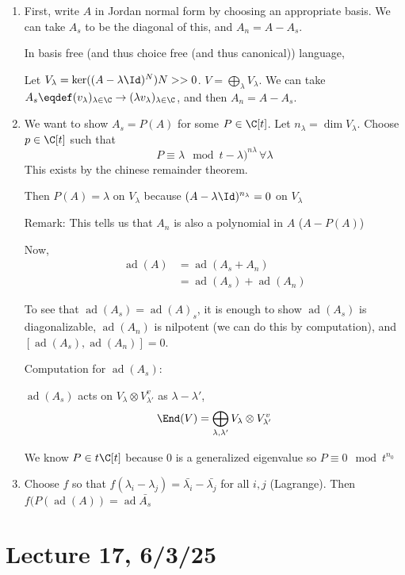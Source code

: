 \documentclass[x11names,reqno,14pt]{extarticle}
\DeclareMathOperator{\ad}{ad}
\begin{document}
\proof[sketch]
\begin{enumerate}

\item First, write $A$ in Jordan normal form by choosing an appropriate basis. We can take $A_s$ to be the diagonal of this, and $A_n = A - A_s$. 

In basis free (and thus choice free (and thus canonical)) language, 

Let $V_\lambda = \ker((A-\lambda\Id)^N) N >>0$. $V = \bigoplus_\lambda V_\lambda$. We can take $A_s \eqdef (v_\lambda)_{\lambda\in\C} \to (\lambda v_\lambda)_{\lambda\in\C}$, and then $A_n = A - A_s$.

\item We want to show $A_s = P(A)$ for some $P \in \C[t]$. Let $n_\lambda = \dim V_\lambda$. Choose $p \in \C[t]$ such that 
\[
P \equiv \lambda \mod {t-\lambda)^{n\lambda}}\,\forall\lambda
\]
This exists by the chinese remainder theorem. 

Then $P(A) = \lambda$ on $V_\lambda$ because $(A - \lambda\Id)^{n_\lambda} = 0$ on $V_\lambda$

Remark: This tells us that $A_n$ is also a polynomial in $A$ ($A - P(A)$)

Now,
\begin{align*}
\ad(A) & = \ad(A_s + A_n) \\
& = \ad(A_s) + \ad(A_n)
\end{align*}

To see that $\ad(A_s) = \ad(A)_s$, it is enough to show $\ad(A_s)$ is diagonalizable, $\ad(A_n)$ is nilpotent (we can do this by computation), and $[\ad(A_s),\ad(A_n)] = 0$.

Computation for $\ad(A_s)$: 

$\ad(A_s)$ acts on $V_\lambda\otimes V_{\lambda'}^v$ as $\lambda - \lambda'$, 
\[
\End(V) = \bigoplus_{\lambda,\lambda'} V_\lambda\otimes V_{\lambda'}^v
\]

We know $P \in t\C[t]$ because $0$ is a generalized eigenvalue so $P \equiv 0 \mod t^{n_0}$

\item Choose $f$ so that $f(\lambda_i - \lambda_j) = \bar{\lambda_i} - \bar{\lambda_j}$ for all $i, j$ (Lagrange). Then $f(P(\ad(A)) = \ad\bar{A_s}$

\end{enumerate}

\section*{Lecture 17, 6/3/25}
\end{document}

